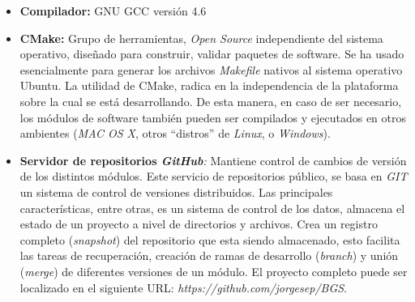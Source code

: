 \begin{itemize}
\item \textbf{Compilador:} GNU GCC versión 4.6
\item \textbf{CMake:} Grupo de herramientas, \textit{Open Source} independiente del sistema operativo, diseñado para construir, validar paquetes de software. Se ha usado esencialmente para generar los archivos \textit{Makefile} nativos al sistema operativo Ubuntu. La utilidad de CMake, radica en la independencia de la plataforma sobre la cual se está desarrollando. De esta manera, en caso de ser necesario, los módulos de software también pueden ser compilados y ejecutados en otros ambientes (\textit{MAC OS X}, otros ``distros'' de \textit{Linux}, o \textit{Windows}).
\item \textbf{Servidor de repositorios \textit{GitHub}}\cite{github}\textit{:} Mantiene control de cambios de versión de los distintos módulos. Este servicio de repositorios público, se basa en \textit{GIT} un sistema de control de versiones distribuidos. Las principales características, entre otras, es un sistema de control de los datos, almacena el estado de un proyecto a nivel de directorios y archivos. Crea un registro completo (\textit{snapshot}) del repositorio que esta siendo almacenado, esto facilita las tareas de recuperación, creación de ramas de desarrollo (\textit{branch}) y unión (\textit{merge}) de diferentes versiones de un módulo. El proyecto completo puede ser localizado en el siguiente URL:\textit{ \textit{https://github.com/jorgesep/BGS}}. 
\end{itemize}

